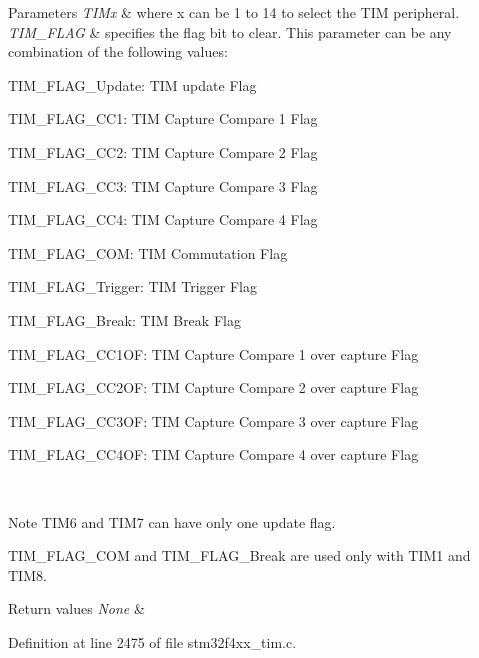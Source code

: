 \begin{DoxyParams}{Parameters}
{\em T\+I\+Mx} & where x can be 1 to 14 to select the T\+IM peripheral. \\
\hline
{\em T\+I\+M\+\_\+\+F\+L\+AG} & specifies the flag bit to clear. This parameter can be any combination of the following values\+: \begin{DoxyItemize}
\item T\+I\+M\+\_\+\+F\+L\+A\+G\+\_\+\+Update\+: T\+IM update Flag \item T\+I\+M\+\_\+\+F\+L\+A\+G\+\_\+\+C\+C1\+: T\+IM Capture Compare 1 Flag \item T\+I\+M\+\_\+\+F\+L\+A\+G\+\_\+\+C\+C2\+: T\+IM Capture Compare 2 Flag \item T\+I\+M\+\_\+\+F\+L\+A\+G\+\_\+\+C\+C3\+: T\+IM Capture Compare 3 Flag \item T\+I\+M\+\_\+\+F\+L\+A\+G\+\_\+\+C\+C4\+: T\+IM Capture Compare 4 Flag \item T\+I\+M\+\_\+\+F\+L\+A\+G\+\_\+\+C\+OM\+: T\+IM Commutation Flag \item T\+I\+M\+\_\+\+F\+L\+A\+G\+\_\+\+Trigger\+: T\+IM Trigger Flag \item T\+I\+M\+\_\+\+F\+L\+A\+G\+\_\+\+Break\+: T\+IM Break Flag \item T\+I\+M\+\_\+\+F\+L\+A\+G\+\_\+\+C\+C1\+OF\+: T\+IM Capture Compare 1 over capture Flag \item T\+I\+M\+\_\+\+F\+L\+A\+G\+\_\+\+C\+C2\+OF\+: T\+IM Capture Compare 2 over capture Flag \item T\+I\+M\+\_\+\+F\+L\+A\+G\+\_\+\+C\+C3\+OF\+: T\+IM Capture Compare 3 over capture Flag \item T\+I\+M\+\_\+\+F\+L\+A\+G\+\_\+\+C\+C4\+OF\+: T\+IM Capture Compare 4 over capture Flag\end{DoxyItemize}
\\
\hline
\end{DoxyParams}
\begin{DoxyNote}{Note}
T\+I\+M6 and T\+I\+M7 can have only one update flag. 

T\+I\+M\+\_\+\+F\+L\+A\+G\+\_\+\+C\+OM and T\+I\+M\+\_\+\+F\+L\+A\+G\+\_\+\+Break are used only with T\+I\+M1 and T\+I\+M8.
\end{DoxyNote}

\begin{DoxyRetVals}{Return values}
{\em None} & \\
\hline
\end{DoxyRetVals}


Definition at line 2475 of file stm32f4xx\+\_\+tim.\+c.


